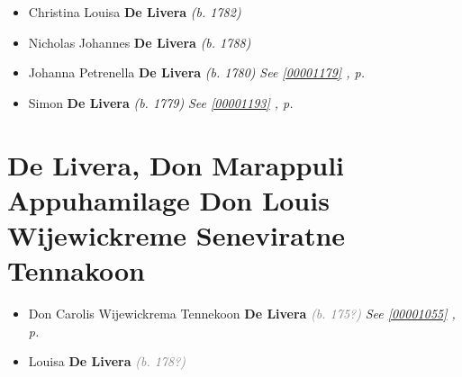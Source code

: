 \documentclass[10pt, openany]{book}
\begin{document}
\begin{itemize}
{\begin{itemize}
{\begin{itemize}
{\begin{itemize}
\end{itemize}}
\end{itemize}
   }
\item{Christina Louisa \textbf{De Livera} \textcolor{slorange}{\textit{(b. 1782)}}
   }
\item{Nicholas Johannes \textbf{De Livera} \textcolor{slorange}{\textit{(b. 1788)}}
   }
\item{Johanna Petrenella \textbf{De Livera} \textcolor{slorange}{\textit{(b. 1780)}} \textcolor{slteal}{\textit{See  \autoref{00001179} \textit{, p. \pageref{00001179} }}}}
\item{Simon \textbf{De Livera} \textcolor{slorange}{\textit{(b. 1779)}} \textcolor{slteal}{\textit{See  \autoref{00001193} \textit{, p. \pageref{00001193} }}}}
\end{itemize}}
\end{itemize}
     
\chapter{De Livera, Don Marappuli Appuhamilage Don Louis Wijewickreme Seneviratne Tennakoon}
\label{00001052}
\textcolor{slmaroon}{\textit{}}
\begin{itemize}
\item{Don Carolis Wijewickrema Tennekoon \textbf{De Livera} \textcolor{gray}{\textit{(b. 175?)}} \textcolor{slteal}{\textit{See  \autoref{00001055} \textit{, p. \pageref{00001055} }}}}
\item{Louisa \textbf{De Livera} \textcolor{gray}{\textit{(b. 178?)}}
  }
\end{itemize}
         
\end{document}
